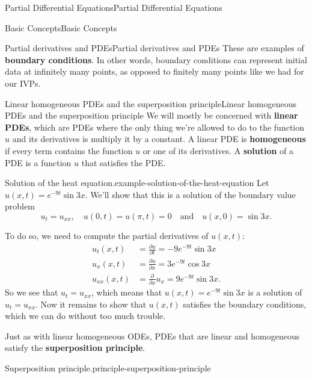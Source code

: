 \documentclass[10pt,]{book}
\newcommand{\terminology}[1]{\textbf{#1}}
\numberwithin{equation}{section}
\begin{document}
\begin{chapterptx}{Partial Differential Equations}{}{Partial Differential Equations}{}{}
\begin{sectionptx}{Basic Concepts}{}{Basic Concepts}{}{}
\begin{subsectionptx}{Partial derivatives and PDEs}{}{Partial derivatives and PDEs}{}{}
These are examples of \terminology{boundary conditions}. In other words, boundary conditions can represent initial data at infinitely many points, as opposed to finitely many points like we had for our IVPs.%
\end{subsectionptx}
%
%
\typeout{************************************************}
\typeout{************************************************}
%
\begin{subsectionptx}{Linear homogeneous PDEs and the superposition principle}{}{Linear homogeneous PDEs and the superposition principle}{}{}\label{subsection-linear-homogeneous-pdes-and-the-superposition-principle}
\hypertarget{p-441}{}%
We will mostly be concerned with \terminology{linear PDEs}, which are PDEs where the only thing we're allowed to do to the function \(u\) and its derivatives is multiply it by a constant. A linear PDE is \terminology{homogeneous} if every term contains the function \(u\) or one of its derivatives. A \terminology{solution} of a PDE is a function \(u\) that satisfies the PDE.%
\begin{example}{Solution of the heat equation.}{example-solution-of-the-heat-equation}%
\hypertarget{p-442}{}%
Let \(u(x,t) = e^{-9t}\sin3x\). We'll show that this is a solution of the boundary value problem%
\begin{equation*}
u_{t} = u_{xx},\quad u(0,t) = u(\pi,t) = 0\quad\text{and}\quad u(x,0) = \sin3x.
\end{equation*}
%
\par
\hypertarget{p-443}{}%
To do so, we need to compute the partial derivatives of \(u(x,t):\)%
%
\begin{align*}
u_{t}(x,t) & = \frac{\partial u}{\partial t} = -9e^{-9t}\sin3x \\
u_{x}(x,t) & = \frac{\partial u}{\partial x} = 3e^{-9t}\cos3x \\
u_{xx}(x,t) & = \frac{\partial}{\partial x}u_{x} = 9e^{-9t}\sin3x. 
\end{align*}
\hypertarget{p-444}{}%
So we see that \(u_{t} = u_{xx}\), which means that \(u(x,t) = e^{-9t}\sin3x\) is a solution of \(u_{t} = u_{xx}\). Now it remains to show that \(u(x,t)\) satisfies the boundary conditions, which we can do without too much trouble.%
\end{example}
\hypertarget{p-445}{}%
Just as with linear homogeneous ODEs, PDEs that are linear and homogeneous satisfy the \terminology{superposition principle}.%
\begin{principle}{Superposition principle.}{}{principle-superposition-principle}%

\end{principle}
\end{subsectionptx}
\end{sectionptx}
\end{chapterptx}
\end{document}
